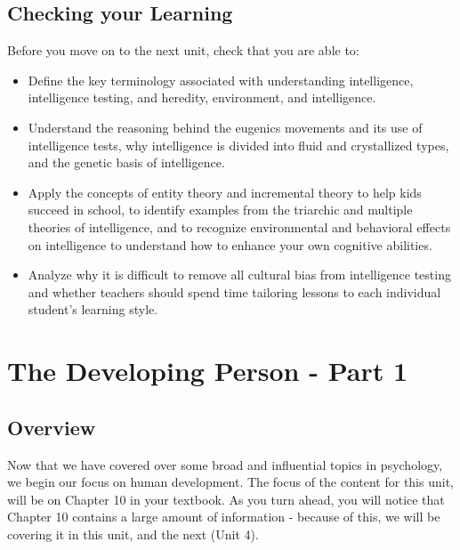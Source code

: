 \documentclass[
]{book}
\providecommand{\tightlist}{%
  \setlength{\itemsep}{0pt}\setlength{\parskip}{0pt}}
\begin{document}
\hypertarget{checking-your-learning-1}{%
\section*{Checking your Learning}\label{checking-your-learning-1}}

\begin{progress}
Before you move on to the next unit, check that you are able to:

\begin{itemize}
\tightlist
\item
  Define the key terminology associated with understanding intelligence, intelligence testing, and heredity, environment, and intelligence.\\
\item
  Understand the reasoning behind the eugenics movements and its use of intelligence tests, why intelligence is divided into fluid and crystallized types, and the genetic basis of intelligence.\\
\item
  Apply the concepts of entity theory and incremental theory to help kids succeed in school, to identify examples from the triarchic and multiple theories of intelligence, and to recognize environmental and behavioral effects on intelligence to understand how to enhance your own cognitive abilities.\\
\item
  Analyze why it is difficult to remove all cultural bias from intelligence testing and whether teachers should spend time tailoring lessons to each individual student's learning style.
\end{itemize}
\end{progress}

\hypertarget{the-developing-person---part-1}{%
\chapter{The Developing Person - Part 1}\label{the-developing-person---part-1}}

\hypertarget{overview-2}{%
\section*{Overview}\label{overview-2}}

Now that we have covered over some broad and influential topics in psychology, we begin our focus on human development. The focus of the content for this unit, will be on Chapter 10 in your textbook. As you turn ahead, you will notice that Chapter 10 contains a large amount of information - because of this, we will be covering it in this unit, and the next (Unit 4).
\end{document}
